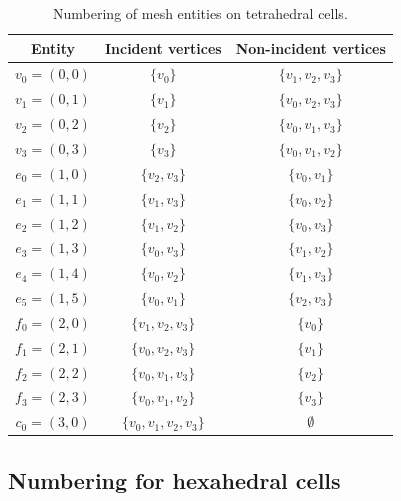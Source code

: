 \begin{table}[H]
\linespread{1.1}\selectfont
  \begin{center}
    \begin{tabular}{|c|c|c|}
      \hline
      Entity & Incident vertices & Non-incident vertices \\
      \hline
      \hline
      $v_0 = (0, 0)$ & $\{v_0\}$ & $\{v_1, v_2, v_3\}$ \\
      \hline
      $v_1 = (0, 1)$ & $\{v_1\}$ & $\{v_0, v_2, v_3\}$ \\
      \hline
      $v_2 = (0, 2)$ & $\{v_2\}$ & $\{v_0, v_1, v_3\}$ \\
      \hline
      $v_3 = (0, 3)$ & $\{v_3\}$ & $\{v_0, v_1, v_2\}$ \\
      \hline
      $e_0 = (1, 0)$ & $\{v_2, v_3\}$ & $\{v_0, v_1\}$ \\
      \hline
      $e_1 = (1, 1)$ & $\{v_1, v_3\}$ & $\{v_0, v_2\}$ \\
      \hline
      $e_2 = (1, 2)$ & $\{v_1, v_2\}$ & $\{v_0, v_3\}$ \\
      \hline
      $e_3 = (1, 3)$ & $\{v_0, v_3\}$ & $\{v_1, v_2\}$ \\
      \hline
      $e_4 = (1, 4)$ & $\{v_0, v_2\}$ & $\{v_1, v_3\}$ \\
      \hline
      $e_5 = (1, 5)$ & $\{v_0, v_1\}$ & $\{v_2, v_3\}$ \\
      \hline
      $f_0 = (2, 0)$ & $\{v_1, v_2, v_3\}$ & $\{v_0\}$ \\
      \hline
      $f_1 = (2, 1)$ & $\{v_0, v_2, v_3\}$ & $\{v_1\}$ \\
      \hline
      $f_2 = (2, 2)$ & $\{v_0, v_1, v_3\}$ & $\{v_2\}$ \\
      \hline
      $f_3 = (2, 3)$ & $\{v_0, v_1, v_2\}$ & $\{v_3\}$ \\
      \hline
      $c_0 = (3, 0)$ & $\{v_0, v_1, v_2, v_3\}$ & $\emptyset$ \\
      \hline
    \end{tabular}
    \caption{Numbering of mesh entities on tetrahedral cells.}
        \label{tab:tetrahedron,entities} 
  \end{center}
\end{table}

\subsection{Numbering for hexahedral cells}

